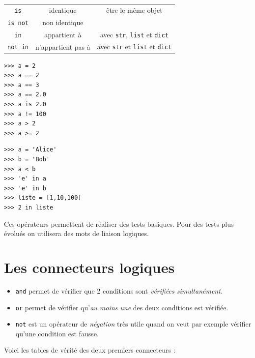 {\begin{tabular}{ccc}
	\texttt{is}                                      & identique                             & être le même objet                                                                                    \\

	\texttt{is not}                                  & non identique                         &                                                                                                       \\

	\texttt{in}                                      & appartient à                          & avec \texttt{str}, \texttt{list} et \texttt{dict}                                   \\

	\texttt{not in}                                  & n'appartient pas à                    & avec \texttt{str} et \texttt{list} et \texttt{dict}                                 \\
\end{tabular}
}\normalsize

\begin{pys}
	\begin{verbatim}
>>> a = 2
>>> a == 2
>>> a == 3
>>> a == 2.0
>>> a is 2.0
>>> a != 100
>>> a > 2
>>> a >= 2
    \end{verbatim}
\end{pys}

\begin{pys}
	\begin{verbatim}
>>> a = 'Alice'
>>> b = 'Bob'
>>> a < b
>>> 'e' in a
>>> 'e' in b
>>> liste = [1,10,100]
>>> 2 in liste
    \end{verbatim}
\end{pys}

Ces opérateurs permettent de réaliser des tests basiques. Pour des tests plus évolués on utilisera des \og mots de liaison \fg{} logiques.

\section{Les connecteurs logiques}

\begin{itemize}
	\item   \texttt{and} permet de vérifier que 2 conditions sont \textit{vérifiées simultanément}.
	\item   \texttt{or} permet de vérifier qu'\textit{au moins une} des deux conditions est vérifiée.
	\item   \texttt{not} est un opérateur de \textit{négation} très utile quand on veut par exemple vérifier qu'une condition est fausse.
\end{itemize}
Voici les tables de vérité des deux premiers connecteurs :

